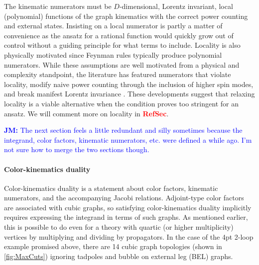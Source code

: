 \documentclass[11pt,letter]{article}
\newcommand{\jm}[1]{\textcolor{blue}{\textbf{JM: }{#1}}}
\newcommand{\sect}{\textbf{\textcolor{red}{RefSec}}}
\begin{document}
The kinematic numerators must be $D$-dimensional, Lorentz invariant, local (polynomial) functions of the graph kinematics with the correct power counting and external states.
Insisting on a local numerator is partly a matter of convenience as the ansatz for a rational function would quickly grow out of control without a guiding principle for what terms to include.
Locality is also physically motivated since Feynman rules typically produce polynomial numerators.
While these assumptions are well motivated from a physical and complexity standpoint, the literature has featured numerators that violate locality, modify naive power counting through the inclusion of higher spin modes, and break manifest Lorentz invariance \cite{Square, WeinzierlBCJLagrangian, Mogull:2015adi, FivePointN4BCJ, Johansson:2017bfl, Ben-Shahar:2022ixa, Cheung:2016prv, Cheung:2021zvb}.
These developments suggest that relaxing locality is a viable alternative when the condition proves too stringent for an ansatz.
We will comment more on locality in \sect{}.

\jm{The next section feels a little redundant and silly sometimes because the integrand, color factors, kinematic numerators, etc. were defined a while ago.  I'm not sure how to merge the two sections though.}

\paragraph{Color-kinematics duality}

Color-kinematics duality is a statement about color factors, kinematic numerators, and the accompanying Jacobi relations.
Adjoint-type color factors are associated with cubic graphs, so satisfying color-kinematics duality implicitly requires expressing the integrand in terms of such graphs. As mentioned earlier, this is possible to do even for a theory with quartic (or higher multiplicity) vertices by multiplying and dividing by propagators.
In the case of the 4pt 2-loop example promised above, there are 14 cubic graph topologies (shown in \cref{fig:MaxCuts}) ignoring tadpoles and bubble on external leg (BEL) graphs.
\end{document}
